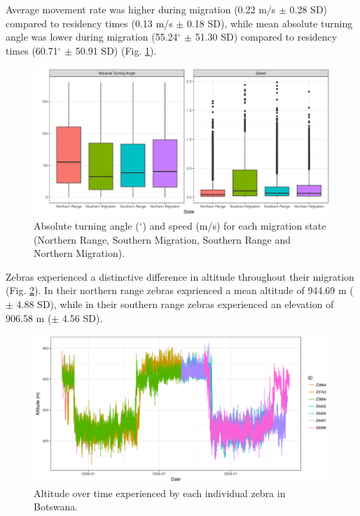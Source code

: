 \documentclass[12pt,a4paper, twoside, english]{article}
\begin{document}


Average movement rate was higher during migration (0.22 m/s $\pm$ 0.28 SD) compared to residency times (0.13 m/s $\pm$ 0.18 SD), while mean absolute turning angle was lower during migration (55.24$^\circ$ $\pm$ 51.30 SD) compared to residency times (60.71$^\circ$ $\pm$ 50.91 SD) (Fig. \ref{fig:state_move_bwa}).

\begin{figure}[H]
  \centering
  \includegraphics[width=\textwidth]{figures/State_Move_BWA.png}
  \caption[Absolute turning angle and speed per state]{Absolute turning angle ($^\circ$) and speed (m/s) for each migration state (Northern Range, Southern Migration, Southern Range and Northern Migration).}
  \label{fig:state_move_bwa}
\end{figure}

Zebras experienced a distinctive difference in altitude throughout their migration (Fig. \ref{fig:dem_bwa}). In their northern range zebras exprienced a mean altitude of 944.69 m ($\pm$ 4.88 SD), while in their southern range zebras experienced an elevation of 906.58 m ($\pm$ 4.56 SD).

\begin{figure}[H]
  \centering
  \includegraphics[width=\textwidth]{figures/Zebra_dem_BWA.png}
  \caption[Altitude over time experienced by Ngamiland's zebras]{Altitude over time experienced by each individual zebra in Botswana.}
  \label{fig:dem_bwa}
\end{figure}
\end{document}
